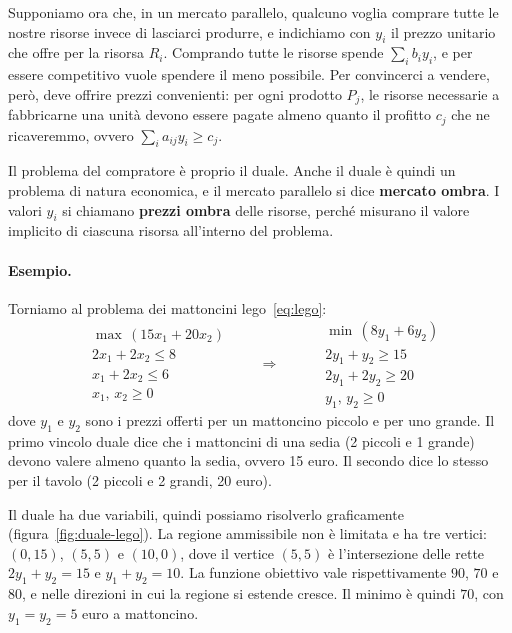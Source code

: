 Supponiamo ora che, in un mercato parallelo, qualcuno voglia comprare tutte le nostre risorse invece di lasciarci produrre, e indichiamo con $y_i$ il prezzo unitario che offre per la risorsa $R_i$. Comprando tutte le risorse spende $\sum_i b_i y_i$, e per essere competitivo vuole spendere il meno possibile. Per convincerci a vendere, però, deve offrire prezzi convenienti: per ogni prodotto $P_j$, le risorse necessarie a fabbricarne una unità devono essere pagate almeno quanto il profitto $c_j$ che ne ricaveremmo, ovvero $\sum_i a_{ij} y_i \ge c_j$.

Il problema del compratore è proprio il duale. Anche il duale è quindi un problema di natura economica, e il mercato parallelo si dice \textbf{mercato ombra}. I valori $y_i$ si chiamano \textbf{prezzi ombra} delle risorse, perché misurano il valore implicito di ciascuna risorsa all'interno del problema.

\paragraph{Esempio.}
Torniamo al problema dei mattoncini lego~\eqref{eq:lego}:
\[
\begin{aligned}
&\max\, (15x_1 + 20x_2) \\
&2x_1 + 2x_2 \le 8 \\
&x_1 + 2x_2 \le 6 \\
&x_1,\, x_2 \ge 0
\end{aligned}
\qquad\Longrightarrow\qquad
\begin{aligned}
&\min\, (8y_1 + 6y_2) \\
&2y_1 + y_2 \ge 15 \\
&2y_1 + 2y_2 \ge 20 \\
&y_1,\, y_2 \ge 0
\end{aligned}
\]
dove $y_1$ e $y_2$ sono i prezzi offerti per un mattoncino piccolo e per uno grande. Il primo vincolo duale dice che i mattoncini di una sedia (2 piccoli e 1 grande) devono valere almeno quanto la sedia, ovvero 15 euro. Il secondo dice lo stesso per il tavolo (2 piccoli e 2 grandi, 20 euro).

Il duale ha due variabili, quindi possiamo risolverlo graficamente (figura~\ref{fig:duale-lego}). La regione ammissibile non è limitata e ha tre vertici: $(0, 15)$, $(5, 5)$ e $(10, 0)$, dove il vertice $(5, 5)$ è l'intersezione delle rette $2y_1 + y_2 = 15$ e $y_1 + y_2 = 10$. La funzione obiettivo vale rispettivamente $90$, $70$ e $80$, e nelle direzioni in cui la regione si estende cresce. Il minimo è quindi $70$, con $y_1 = y_2 = 5$ euro a mattoncino.

